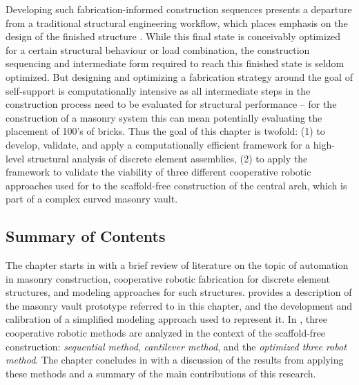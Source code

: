 Developing such fabrication-informed construction sequences presents a departure from a traditional structural engineering workflow, which places emphasis on the design of the finished structure \cite{sharif_bim_2015}. While this final state is conceivably optimized for a certain structural behaviour or load combination, the construction sequencing and intermediate form required to reach this finished state is seldom optimized. But designing and optimizing a fabrication strategy around the goal of self-support is computationally intensive as all intermediate steps in the construction process need to be evaluated for structural performance -- for the construction of a masonry system this can mean potentially evaluating the placement of 100's of bricks. Thus the goal of this chapter is twofold: (1) to develop, validate, and apply a computationally efficient framework for a high-level structural analysis of discrete element assemblies, (2) to apply the framework to validate the viability of three different cooperative robotic approaches used for to the scaffold-free construction of the central arch, which is part of a complex curved masonry vault.

\subsection{Summary of Contents}
The chapter starts in  with a brief review of literature on the topic of automation in masonry construction, cooperative robotic fabrication for discrete element structures, and modeling approaches for such structures.  provides a description of the masonry vault prototype referred to in this chapter, and the development and calibration of a simplified modeling approach used to represent it. In , three cooperative robotic methods are analyzed in the context of the scaffold-free construction: \textit{sequential method}, \textit{cantilever method}, and the \textit{optimized three robot method}. The chapter concludes in  with a discussion of the results from applying these methods and a summary of the main contributions of this research.


